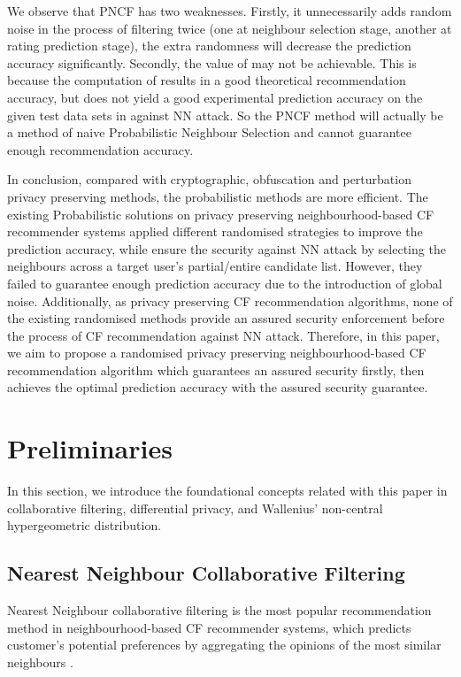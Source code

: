 \documentclass[11pt]{article}
\begin{document}
We observe that PNCF \cite{ZHU2014} has two weaknesses. Firstly, it unnecessarily adds random noise in the process of filtering twice (one at neighbour selection stage, another at rating prediction stage), the extra randomness will decrease the prediction accuracy significantly. Secondly, the value of  may not be achievable. This is because the computation of  results in a good theoretical recommendation accuracy, but does not yield a good experimental prediction accuracy on the given test data sets in \cite{ZHU2014} against NN attack. So the PNCF method \cite{ZHU2014} will actually be a method of naive Probabilistic Neighbour Selection \cite{ADAMOPOULOS2014} and cannot guarantee enough recommendation accuracy.

In conclusion, compared with cryptographic, obfuscation and perturbation privacy preserving methods, the probabilistic methods are more efficient. The existing Probabilistic solutions \cite{MCSHERRY2009,ADAMOPOULOS2014,ZHU2014} on privacy preserving neighbourhood-based CF recommender systems applied different randomised strategies to improve the prediction accuracy, while ensure the security against NN attack by selecting the  neighbours across a target user's partial/entire candidate list. However, they failed to guarantee enough prediction accuracy due to the introduction of global noise. Additionally, as privacy preserving CF recommendation algorithms, none of the existing randomised methods provide an assured security enforcement before the process of CF recommendation against NN attack. Therefore, in this paper, we aim to propose a randomised privacy preserving neighbourhood-based CF recommendation algorithm which guarantees an assured security firstly, then achieves the optimal prediction accuracy with the assured security guarantee.


\section{Preliminaries}
\label{PRE}
In this section, we introduce the foundational concepts related with this paper in collaborative filtering, differential privacy, and Wallenius' non-central hypergeometric distribution.

\subsection{ Nearest Neighbour Collaborative Filtering}
 Nearest Neighbour collaborative filtering is the most popular recommendation method in neighbourhood-based CF recommender systems, which predicts customer's potential preferences by aggregating the opinions of the  most similar neighbours \cite{ADOMAVICIUS2005}.
\end{document}
